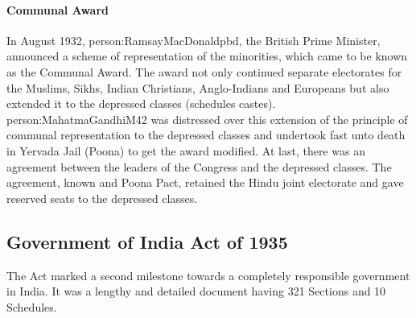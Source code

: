 \paragraph{Communal Award}
In August 1932, \gls{person:RamsayMacDonaldpbd}, the British Prime Minister, announced a scheme of representation of the minorities, which came to be known as the Communal Award. The award not only continued separate electorates for the Muslims, Sikhs, Indian Christians, Anglo-Indians and Europeans but also extended it to the depressed classes (schedules castes). \gls{person:MahatmaGandhiM42} was distressed over this extension of the principle of communal representation to the depressed classes and undertook fast unto death in Yervada Jail (Poona) to get the award modified. At last, there was an agreement between the leaders of the Congress and the depressed classes. The agreement, known and Poona Pact, retained the Hindu joint electorate and gave reserved seats to the depressed classes.



\subsection{Government of India Act of 1935}

The Act marked a second milestone towards a completely responsible government in India. It was a lengthy and detailed document having 321 Sections and 10 Schedules.

